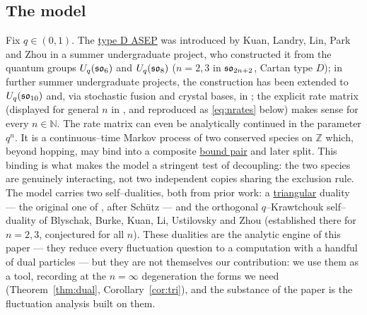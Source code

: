 \documentclass[11pt]{article}
\theoremstyle{plain}
\theoremstyle{definition}
\theoremstyle{remark}
\newcommand{\Z}{\mathbb{Z}}\newcommand{\R}{\mathbb{R}}\newcommand{\N}{\mathbb{N}}
\begin{document}
\subsection{The model}\label{sec:intromodel}
Fix $q\in(0,1)$. The \underline{type D ASEP} was introduced by Kuan, Landry, Lin, Park and
Zhou \cite{KLLPZ} in a summer undergraduate project, who constructed it from the quantum groups $U_q(\mathfrak{so}_6)$ and
$U_q(\mathfrak{so}_8)$ ($n=2,3$ in $\mathfrak{so}_{2n+2}$, Cartan type $D$); in further summer undergraduate projects, the construction has been extended to $U_q(\mathfrak{so}_{10})$ \cite{RSL} and, via stochastic fusion and crystal bases, in
\cite{BEPS}; the explicit rate matrix (displayed for general $n$ in \cite[\S2.1]{REU},
and reproduced as \eqref{eq:nrates} below) makes sense for every $n\in\N$. The rate matrix can even be analytically continued in the parameter $q^n$. It is a continuous--time Markov process of two conserved species on $\Z$ which, beyond
hopping, may bind into a composite \underline{bound pair} and later split. This binding is
what makes the model a stringent test of decoupling: the two species are genuinely
interacting, not two independent copies sharing the exclusion rule. The model carries
two self--dualities, both from prior work: a \underline{triangular} duality --- the
original one of \cite{KLLPZ}, after Sch\"utz \cite{SchutzDual} --- and the orthogonal
$q$--Krawtchouk self--duality of Blyschak, Burke, Kuan, Li, Ustilovsky and Zhou
\cite{REU} (established there for $n=2,3$, conjectured for all $n$). These dualities
are the analytic engine of this paper --- they reduce every fluctuation question to a
computation with a handful of dual particles --- but they are not themselves our
contribution: we use them as a tool, recording at the $n=\infty$ degeneration the
forms we need (Theorem~\ref{thm:dual}, Corollary~\ref{cor:tri}), and the substance of
the paper is the fluctuation analysis built on them.
\end{document}
